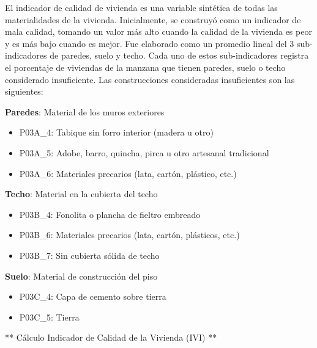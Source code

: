 \documentclass[
  letterpaper,
  DIV=11,
  numbers=noendperiod]{scrreprt}
\providecommand{\tightlist}{%
  \setlength{\itemsep}{0pt}\setlength{\parskip}{0pt}}\usepackage{longtable,booktabs,array}
\begin{document}
El indicador de calidad de vivienda es una variable sintética de todas
las materialidades de la vivienda. Inicialmente, se construyó como un
indicador de mala calidad, tomando un valor más alto cuando la calidad
de la vivienda es peor y es más bajo cuando es mejor. Fue elaborado como
un promedio lineal del 3 sub-indicadores de paredes, suelo y techo. Cada
uno de estos sub-indicadores registra el porcentaje de viviendas de la
manzana que tienen paredes, suelo o techo considerado insuficiente. Las
construcciones consideradas insuficientes son las siguientes:

\textbf{Paredes}: Material de los muros exteriores

\begin{itemize}
\tightlist
\item
  P03A\_4: Tabique sin forro interior (madera u otro)
\item
  P03A\_5: Adobe, barro, quincha, pirca u otro artesanal tradicional
\item
  P03A\_6: Materiales precarios (lata, cartón, plástico, etc.)
\end{itemize}

\textbf{Techo}: Material en la cubierta del techo

\begin{itemize}
\tightlist
\item
  P03B\_4: Fonolita o plancha de fieltro embreado
\item
  P03B\_6: Materiales precarios (lata, cartón, plásticos, etc.)
\item
  P03B\_7: Sin cubierta sólida de techo
\end{itemize}

\textbf{Suelo}: Material de construcción del piso

\begin{itemize}
\tightlist
\item
  P03C\_4: Capa de cemento sobre tierra
\item
  P03C\_5: Tierra
\end{itemize}

** Cálculo Indicador de Calidad de la Vivienda (IVI) **
\end{document}
